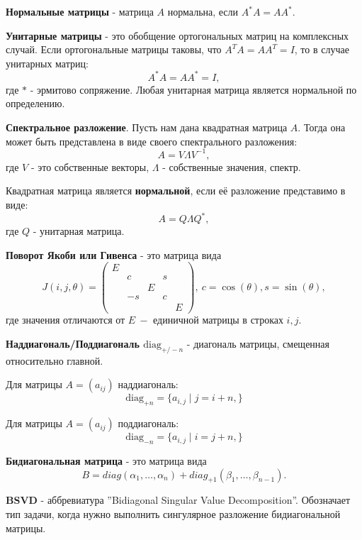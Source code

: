 \textbf{Нормальные матрицы} - матрица \(A\) нормальна, если \(A^*A=AA^*\).

\textbf{Унитарные матрицы} - это обобщение ортогональных матриц на комплексных случай. Если ортогональные матрицы таковы, что \(A^TA=AA^T=I\), то в случае унитарных матриц:
\[A^*A=AA^*=I,\]
где \(*\) - эрмитово сопряжение. Любая унитарная матрица является нормальной по определению.

\textbf{Спектральное разложение}. Пусть нам дана квадратная матрица \(A\). Тогда она может быть представлена в виде своего спектрального разложения:
\[ A=V\Lambda V^{-1},\]
 где \(V\) - это собственные векторы, \(\Lambda\) - собственные значения, спектр.

Квадратная матрица является \textbf{нормальной}, если её разложение представимо в виде:
\[A=Q \Lambda Q^*,\]
где \(Q\) - унитарная матрица. 

\textbf{Поворот Якоби или Гивенса} - это матрица вида
\[ \label{eq:2:1}
    J(i,j,\theta) = 
    \begin{pmatrix}E&&&&\\
        &c&&s\\
        &&E&&\\
        &-s&&c\\
        &&&&E
    \end{pmatrix},\
    c = \cos(\theta), s =\sin(\theta), 
\]
где значения отличаются от \(E\ - \) единичной матрицы в строках \(i, j\).

\textbf{Наддиагональ/Поддиагональ $\mathrm{diag}_{+/-n}$} - диагональ матрицы, смещенная относительно главной.

Для матрицы $A = (a_{ij})$ наддиагональ:
\begin{equation}
    \mathrm{diag}_{+n} = \{a_{i,j} \mid j = i + n,\}
\end{equation}
   
Для матрицы $A = (a_{ij})$ поддиагональ:
\begin{equation}
    \mathrm{diag}_{-n} = \{a_{i,j} \mid i = j + n,\}
\end{equation}
   

\textbf{Бидиагональная матрица} - это матрица вида
\[
        B= diag(\alpha_1,\dots,\alpha_n)+diag_{+1}(\beta_1,\dots,\beta_{n-1}).
\]

\textbf{BSVD} - аббревиатура ''Bidiagonal Singular Value Decomposition''. Обозначает тип задачи, когда нужно выполнить сингулярное разложение бидиагональной матрицы.

